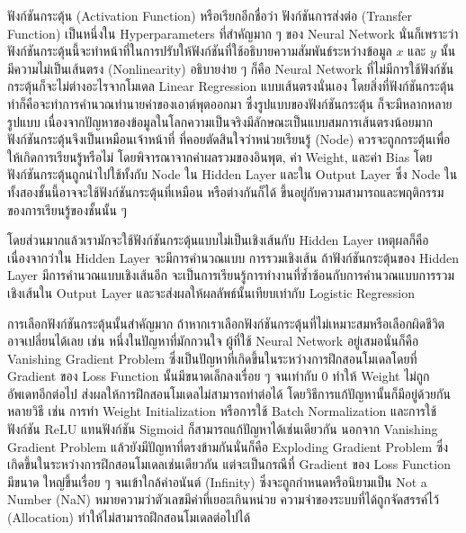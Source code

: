 ฟังก์ชันกระตุ้น (Activation Function) หรือเรียกอีกชื่อว่า ฟังก์ชันการส่งต่อ (Transfer Function) เป็นหนึ่งใน Hyperparameters 
ที่สำคัญมาก ๆ ของ Neural Network นั่นก็เพราะว่าฟังก์ชันกระตุ้นนี้จะทำหน้าที่ในการปรับให้ฟังก์ชันที่ใช้อธิบายความสัมพันธ์ระหว่างข้อมูล $x$ 
และ $y$ นั้นมีความไม่เป็นเส้นตรง (Nonlinearity) อธิบายง่าย ๆ ก็คือ Neural Network ที่ไม่มีการใช้ฟังก์ชันกระตุ้นก็จะไม่ต่างอะไรจากโมเดล
Linear Regression แบบเส้นตรงนั่นเอง โดยสิ่งที่ฟังก์ชันกระตุ้นทำก็คือจะทำการคำนวณทำนายค่าของเอาต์พุตออกมา ซึ่งรูปแบบของฟังก์ชันกระตุ้น%
ก็จะมีหลากหลายรูปแบบ เนื่องจากปัญหาของข้อมูลในโลกความเป็นจริงมีลักษณะเป็นแบบสมการเส้นตรงน้อยมาก ฟังก์ชันกระตุ้นจึงเป็นเหมือนเจ้าหน้าที่%
ที่คอยตัดสินใจว่าหน่วยเรียนรู้ (Node) ควรจะถูกกระตุ้นเพื่อให้เกิดการเรียนรู้หรือไม่ โดยพิจารณาจากค่าผลรวมของอินพุต, ค่า Weight, และค่า Bias 
โดยฟังก์ชันกระตุ้นถูกนำไปใช้ทั้งกับ Node ใน Hidden Layer และใน Output Layer ซึ่ง Node ในทั้งสองชั้นนี้อาจจะใช้ฟังก์ชันกระตุ้นที่เหมือน%
หรือต่างกันก็ได้ ขึ้นอยู่กับความสามารถและพฤติกรรมของการเรียนรู้ของชั้นนั้น ๆ 

โดยส่วนมากแล้วเรามักจะใช้ฟังก์ชันกระตุ้นแบบไม่เป็นเชิงเส้นกับ Hidden Layer เหตุผลก็คือเนื่องจากว่าใน Hidden Layer จะมีการคำนวณแบบ%
การรวมเชิงเส้น ถ้าฟังก์ชันกระตุ้นของ Hidden Layer มีการคำนวณแบบเชิงเส้นอีก จะเป็นการเรียนรู้การทำงานที่ซ้ำซ้อนกับการคำนวณแบบการรวม%
เชิงเส้นใน Output Layer และจะส่งผลให้ผลลัพธ์นั้นเทียบเท่ากับ Logistic Regression 

การเลือกฟังก์ชันกระตุ้นนั้นสำคัญมาก ถ้าหากเราเลือกฟังก์ชันกระตุ้นที่ไม่เหมาะสมหรือเลือกผิดชีวิตอาจเปลี่ยนได้เลย เช่น หนึ่งในปัญหาที่มักกวนใจ%
ผู้ที่ใช้ Neural Network อยู่เสมอนั่นก็คือ Vanishing Gradient Problem ซึ่งเป็นปัญหาที่เกิดขึ้นในระหว่างการฝึกสอนโมเดลโดยที่ Gradient 
ของ Loss Function นั้นมีขนาดเล็กลงเรื่อย ๆ จนเท่ากับ 0 ทำให้ Weight ไม่ถูกอัพเดทอีกต่อไป ส่งผลให้การฝึกสอนโมเดลไม่สามารถทำต่อได้
โดยวิธีการแก้ปัญหานั้นก็มีอยู่ด้วยกันหลายวิธี เช่น การทำ Weight Initialization หรือการใช้ Batch Normalization และการใช้ฟังก์ชัน 
ReLU แทนฟังก์ชัน Sigmoid ก็สามารถแก้ปัญหาได้เช่นเดียวกัน นอกจาก Vanishing Gradient Problem แล้วยังมีปัญหาที่ตรงข้ามกันนั่นก็คือ 
Exploding Gradient Problem ซึ่งเกิดขึ้นในระหว่างการฝึกสอนโมเดลเช่นเดียวกัน แต่จะเป็นกรณีที่ Gradient ของ Loss Function มีขนาด%
ใหญ่ขึ้นเรื่อย ๆ จนเข้าใกล้ค่าอนันต์ (Infinity) ซึ่งจะถูกกำหนดหรือนิยามเป็น Not a Number (NaN) หมายความว่าตัวเลขมีค่าที่เยอะเกินหน่วย%
ความจำของระบบที่ได้ถูกจัดสรรค์ไว้ (Allocation) ทำให้ไม่สามารถฝึกสอนโมเดลต่อไปได้

